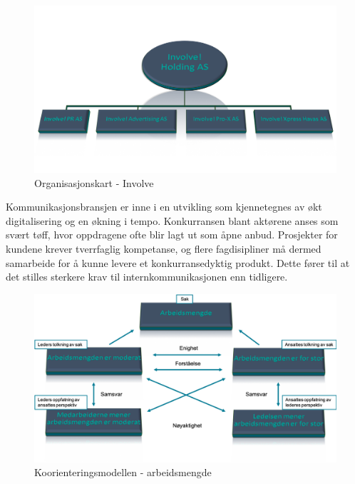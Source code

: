 \begin{figure}[H]
\centering
\includegraphics [scale=0.45]{bilder/org.png}
\caption{Organisasjonskart - Involve}
\label{fig:org}
\end{figure}

Kommunikasjonsbransjen er inne i en utvikling som kjennetegnes av økt digitalisering og en økning i tempo. Konkurransen blant aktørene anses som svært tøff, hvor oppdragene ofte blir lagt ut som åpne anbud. Prosjekter for kundene krever tverrfaglig kompetanse, og flere fagdisipliner må dermed samarbeide for å kunne levere et konkurransedyktig produkt. Dette fører til at det stilles sterkere krav til internkommunikasjonen enn tidligere.

\begin{figure}[H]
\centering
\includegraphics [scale=0.6]{bilder/koo.png}
\caption{Koorienteringsmodellen - arbeidsmengde}
\label{fig:koo}
\end{figure}
